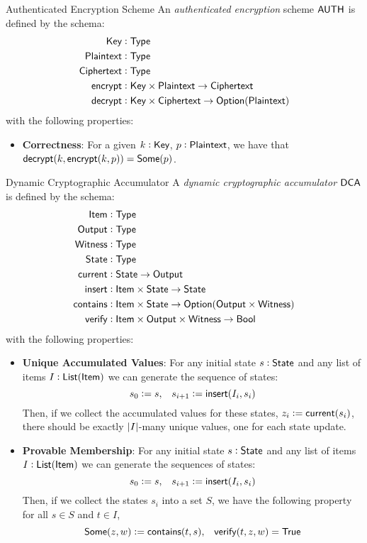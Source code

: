 \begin{definitiontoc}{Authenticated Encryption Scheme}
    An \emph{authenticated encryption} scheme ${\textsf{AUTH}}$ is defined by the schema:
    \begin{align*}
        {\textsf{Key}}        &: {\textsf{Type}} \\
        {\textsf{Plaintext}}  &: {\textsf{Type}} \\
        {\textsf{Ciphertext}} &: {\textsf{Type}} \\
        {\textsf{encrypt}}    &: {\textsf{Key}} \times {\textsf{Plaintext}} \to {\textsf{Ciphertext}} \\
        {\textsf{decrypt}}    &: {\textsf{Key}} \times {\textsf{Ciphertext}} \to {\textsf{Option}}({\textsf{Plaintext}})
    \end{align*}
    with the following properties:
    \begin{itemize}
        \item \textbf{Correctness}: For a given $k : {\textsf{Key}}$, $p : {\textsf{Plaintext}}$, we have that ${\textsf{decrypt}}(k, {\textsf{encrypt}}(k, p)) = {\textsf{Some}}(p)$.
    \end{itemize}
\end{definitiontoc}

\begin{definitiontoc}{Dynamic Cryptographic Accumulator}
    A \emph{dynamic cryptographic accumulator} ${\textsf{DCA}}$ is defined by the schema:
    \begin{align*}
        {\textsf{Item}}     &: {\textsf{Type}} \\
        {\textsf{Output}}   &: {\textsf{Type}} \\
        {\textsf{Witness}}  &: {\textsf{Type}} \\
        {\textsf{State}}   &: {\textsf{Type}} \\
        {\textsf{current}}  &: {\textsf{State}} \to {\textsf{Output}} \\
        {\textsf{insert}}  &: {\textsf{Item}} \times {\textsf{State}} \to {\textsf{State}} \\
        {\textsf{contains}} &: {\textsf{Item}} \times {\textsf{State}} \to {\textsf{Option}}({\textsf{Output}} \times {\textsf{Witness}}) \\
        {\textsf{verify}}   &: {\textsf{Item}} \times {\textsf{Output}} \times {\textsf{Witness}} \to {\textsf{Bool}}
    \end{align*}
    with the following properties:
    \begin{itemize}
        \item \textbf{Unique Accumulated Values}: For any initial state $s : {\textsf{State}}$ and any list of items $I : {\textsf{List}}({\textsf{Item}})$ we can generate the sequence of states:
            \[s_0 := s, \,\,\,\,\, s_{i + 1} := {\textsf{insert}}(I_i, s_i)\]
            Then, if we collect the accumulated values for these states, $z_i := {\textsf{current}}(s_i)$, there should be exactly $\left|I\right|$-many unique values, one for each state update.
        \item \textbf{Provable Membership}: For any initial state $s : {\textsf{State}}$ and any list of items $I : {\textsf{List}}({\textsf{Item}})$ we can generate the sequences of states:
            \[s_0 := s, \,\,\,\,\, s_{i + 1} := {\textsf{insert}}(I_i, s_i)\]
            Then, if we collect the states $s_i$ into a set $S$, we have the following property for all $s \in S$ and $t \in I$,
            \[{\textsf{Some}}(z, w) := {\textsf{contains}}(t, s), \,\,\,\,\, {\textsf{verify}}(t, z, w) = {\textsf{True}}\]
    \end{itemize}
\end{definitiontoc}


